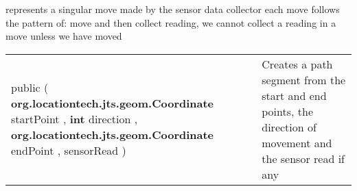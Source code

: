  {\scriptsize represents a singular move made by the sensor data collector\newline%
 each move follows the pattern of: move and then collect reading, \newline%
 we cannot collect a reading in a move unless we have moved
 
\vspace*{-5pt} 
\begin{tabularx}{\linewidth}{m{}|m{}}
\label{tab:PathSegment}
\begin{raggedleft}public  \textbf{\hyperref[tab:PathSegment]{\color{blue}{PathSegment}} }(\newline \hfill 
\hspace*{ 5pt} \textbf{org.locationtech.jts.geom.Coordinate} startPoint , \newline
 \hspace*{ 5pt} \textbf{int} direction , \newline
 \hspace*{ 5pt} \textbf{org.locationtech.jts.geom.Coordinate} endPoint , \newline
 \hspace*{ 5pt} \textbf{\hyperref[tab:Sensor]{\color{blue}{Sensor}}} sensorRead  )
\end{raggedleft} &
 Creates a path segment from the start and end points, the direction of movement and the sensor read if any\\\end{tabularx}
}
